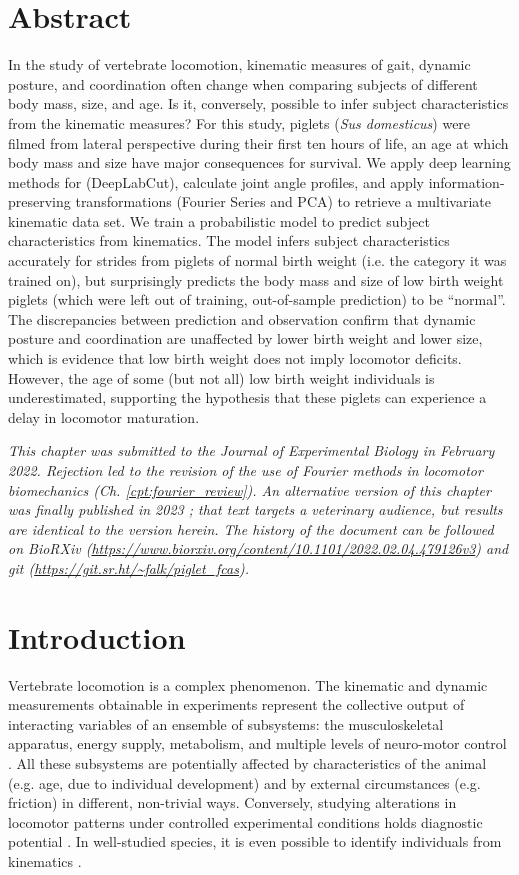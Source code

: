 \clearpage
\section{Abstract}
\label{abstract_22}
In the study of vertebrate locomotion, kinematic measures of gait, dynamic posture, and coordination often change when comparing subjects of different body mass, size, and age.
Is it, conversely, possible to infer subject characteristics from the kinematic measures?
For this study, piglets (\textit{Sus domesticus}) were filmed from lateral perspective during their first ten hours of life, an age at which body mass and size have major consequences for survival.
We apply deep learning methods for  (DeepLabCut), calculate joint angle profiles, and apply information-preserving transformations (Fourier Series and PCA) to retrieve a multivariate kinematic data set.
We train a probabilistic model to predict subject characteristics from kinematics.
The model infers subject characteristics accurately for strides from piglets of normal birth weight (i.e. the category it was trained on), but surprisingly predicts the body mass and size of low birth weight piglets (which were left out of training, out-of-sample prediction) to be ``normal''.
The discrepancies between prediction and observation confirm that dynamic posture and coordination are unaffected by lower birth weight and lower size, which is evidence that low birth weight does not imply locomotor deficits.
However, the age of some (but not all) low birth weight individuals is underestimated, supporting the hypothesis that these piglets can experience a delay in locomotor maturation.

\textit{This chapter was submitted to the Journal of Experimental Biology in February 2022. Rejection led to the revision of the use of Fourier methods in locomotor biomechanics (Ch. \ref{cpt:fourier_review}). An alternative version of this chapter was finally published in 2023 \citep{Mielke2023}; that text targets a veterinary audience, but results are identical to the version herein. The history of the document can be followed on BioRXiv (\url{https://www.biorxiv.org/content/10.1101/2022.02.04.479126v3}) and git (\url{https://git.sr.ht/~falk/piglet_fcas}). }


\FloatBarrier
\clearpage
\section{Introduction}
\label{intro_22}
Vertebrate locomotion is a complex phenomenon.
The kinematic and dynamic measurements obtainable in experiments represent the collective output of interacting variables of an ensemble of subsystems:
the musculoskeletal apparatus, energy supply, metabolism, and multiple levels of neuro-motor control \citep{Nishikawa2007}.
All these subsystems are potentially affected by characteristics of the animal (e.g. age, due to individual development) and by external circumstances (e.g. friction) in different, non-trivial ways.
Conversely, studying alterations in locomotor patterns under controlled experimental conditions holds diagnostic potential \citep[e.g.][]{Figueiredo2018}.
In well-studied species, it is even possible to identify individuals from kinematics \citep[e.g.][]{Patua2021}.


